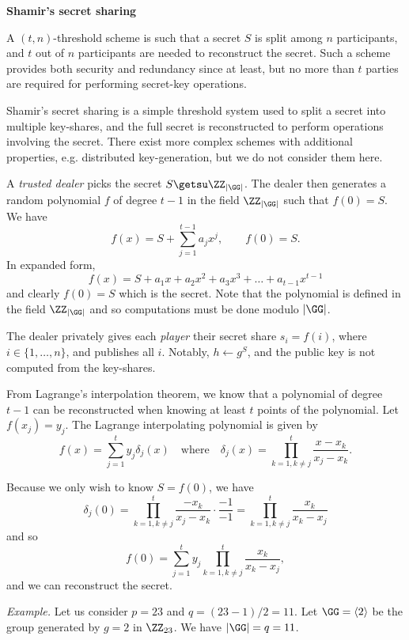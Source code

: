 \documentclass[parskip=half]{scrartcl}
\begin{document}
\begin{center}
  \textbf{Shamir's secret sharing}
\end{center}

A $(t, n)$-threshold scheme is such that a secret $S$ is split among $n$ participants, and $t$ out of $n$ participants are needed to reconstruct the secret.
Such a scheme provides both security and redundancy since at least, but no more than $t$ parties are required for performing secret-key operations.

Shamir's secret sharing is a simple threshold system used to split a secret into multiple key-shares, and the full secret is reconstructed to perform operations involving the secret.
There exist more complex schemes with additional properties, e.g. distributed key-generation, but we do not consider them here.

A \emph{trusted dealer} picks the secret $S \getsu \ZZ_{\lvert\GG\rvert}$.
The dealer then generates a random polynomial $f$ of degree $t-1$ in the field $\ZZ_{\lvert\GG\rvert}$ such that $f(0)=S$.
We have
\[
  f(x)=S + \sum_{j = 1}^{t-1}a_jx^j,\qquad f(0) = S.
\]
In expanded form,
\[
  f(x) = S + a_1x + a_2x^2 + a_3x^3 + \dots + a_{t-1}x^{t-1}
\]
and clearly $f(0)=S$ which is the secret.
Note that the polynomial is defined in the field $\ZZ_{\lvert\GG\rvert}$ and so computations must be done modulo ${\lvert\GG\rvert}$.

The dealer privately gives each \emph{player} their secret share $s_i=f(i)$, where $i\in\{1,\dots,n\}$, and publishes all $i$.
Notably, $h \gets g^S$, and the public key is not computed from the key-shares.

From Lagrange's interpolation theorem, we know that a polynomial of degree $t-1$ can be reconstructed when knowing at least $t$ points of the polynomial.
Let $f(x_j) = y_j$.
The Lagrange interpolating polynomial is given by
\[
  f(x)=\sum_{j=1}^t y_j \delta_j(x)\quad\text{where}\quad
  \delta_j(x)=\prod_{k=1,k\neq j}^{t}\frac{x-x_k}{x_j-x_k}.
\]

Because we only wish to know $S = f(0)$, we have
\[
  \delta_j(0) = \prod_{k=1,k\neq j}^t \frac{-x_k}{x_j-x_k}\cdot\frac{-1}{-1}=
  \prod_{k=1,k\neq j}^t \frac{x_k}{x_k-x_j}
\]
and so
\[
  f(0)= \sum_{j=1}^{t} y_j\prod_{k=1,k\neq j}^{t}\frac{x_k}{x_k - x_j},
\]
and we can reconstruct the secret.

\textit{Example.}
Let us consider $p = 23$ and $q = (23-1)/2 = 11$.
Let $\GG = \langle2\rangle$ be the group generated by $g=2$ in $\ZZ_{23}$.
We have $\lvert\GG\rvert = q = 11$.
\end{document}
